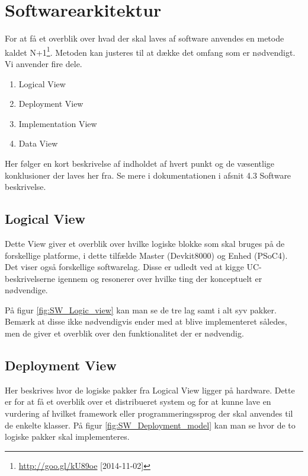 \section{Softwarearkitektur}

For at få et overblik over hvad der skal laves af software anvendes en metode kaldet N+1\footnote{\url{http://goo.gl/kU89oe} [2014-11-02]}. Metoden kan justeres til at dække det omfang som er nødvendigt. Vi anvender fire dele.

\begin{enumerate}
	\item Logical View
	\item Deployment View
	\item Implementation View
	\item Data View
\end{enumerate}

Her følger en kort beskrivelse af indholdet af hvert punkt og de væsentlige konklusioner der laves her fra. Se mere i dokumentationen i afsnit 4.3 Software beskrivelse.

\subsection{Logical View}
Dette View giver et overblik over hvilke logiske blokke som skal bruges på de forskellige platforme, i dette tilfælde Master (Devkit8000) og Enhed (PSoC4). Det viser også forskellige softwarelag. Disse er udledt ved at kigge UC-beskrivelserne igennem og resonerer over hvilke ting der konceptuelt er nødvendige.

På figur \ref{fig:SW_Logic_view} kan man se de tre lag samt i alt syv pakker. Bemærk at disse ikke nødvendigvis ender med at blive implementeret således, men de giver et overblik over den funktionalitet der er nødvendig.


\subsection{Deployment View}
Her beskrives hvor de logiske pakker fra Logical View ligger på hardware. Dette er for at få et overblik over et distribueret system og for at kunne lave en vurdering af hvilket framework eller programmeringssprog der skal anvendes til de enkelte klasser. På figur \ref{fig:SW_Deployment_model} kan man se hvor de to logiske pakker skal implementeres.

